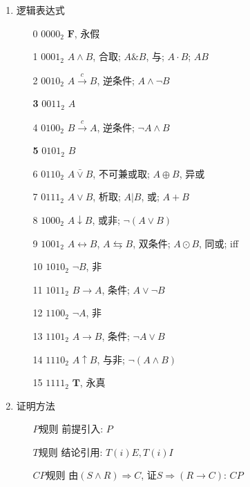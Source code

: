 \documentclass[10pt,a4paper,nofonts]{ctexart}
\begin{document}
\newpage


\begin{multicols}{2}

\begin{enumerate}

\item 逻辑表达式
\begin{enumerate}
\item[0] $0000_2$ $\bm F$, 永假
\item[1] $0001_2$ $A\wedge B$, 合取; $A\& B$, 与; $A\cdot B$; $AB$
\item[2] $0010_2$ $A\stackrel{c}{\to} B$, 逆条件; $A\wedge\neg B$
\item[\bf 3] $0011_2$ $A$
\item[4] $0100_2$ $B\stackrel{c}{\to} A$, 逆条件; $\neg A\wedge B$
\item[\bf 5] $0101_2$ $B$
\item[6] $0110_2$ $A\bar\vee B$, 不可兼或取; $A\oplus B$, 异或
\item[7] $0111_2$ $A\vee B$, 析取; $A|B$, 或; $A+B$
\item[8] $1000_2$ $A\downarrow B$, 或非; $\neg(A\vee B)$
\item[9] $1001_2$ $A\leftrightarrow B$, $A\leftrightarrows B$, 双条件; $A\odot B$, 同或; iff %
\item[10] $1010_2$ $\neg B$, 非
\item[11] $1011_2$ $B\to A$, 条件; $A\vee\neg B$
\item[12] $1100_2$ $\neg A$, 非
\item[13] $1101_2$ $A\to B$, 条件; $\neg A\vee B$
\item[14] $1110_2$ $A\uparrow B$, 与非; $\neg(A\wedge B)$
\item[15] $1111_2$ $\bm T$, 永真
\end{enumerate}

\item 证明方法
\begin{enumerate}
\item[$P$规则] 前提引入: $P$
\item[$T$规则] 结论引用: $T(i)E, T(i)I$
\item[$CP$规则] 由$(S\wedge R) \Rightarrow C$, 证$S \Rightarrow (R\to C)$: $CP$
\end{enumerate}


\end{enumerate}
\end{multicols}
\end{document}
